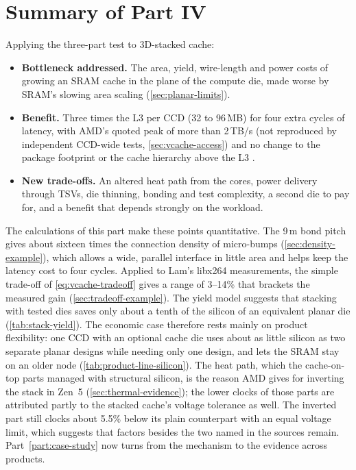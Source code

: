 \section{Summary of Part IV}
Applying the three-part test to 3D-stacked cache:
\begin{itemize}
  \item \textbf{Bottleneck addressed.} The area, yield, wire-length and power costs of growing an SRAM cache in the plane of the compute die, made worse by SRAM's slowing area scaling (\cref{sec:planar-limits}).
  \item \textbf{Benefit.} Three times the L3 per CCD (32 to 96\,MB) for four extra cycles of latency, with AMD's quoted peak of more than 2\,TB/s (not reproduced by independent CCD-wide tests, \cref{sec:vcache-access}) and no change to the package footprint or the cache hierarchy above the L3 \cite{wuu2022vcache,amd2022epyc7003}.
  \item \textbf{New trade-offs.} An altered heat path from the cores, power delivery through TSVs, die thinning, bonding and test complexity, a second die to pay for, and a benefit that depends strongly on the workload.
\end{itemize}

The calculations of this part make these points quantitative. The 9\,\textmu m bond pitch gives about sixteen times the connection density of micro-bumps (\cref{sec:density-example}), which allows a wide, parallel interface in little area and helps keep the latency cost to four cycles. Applied to Lam's libx264 measurements, the simple trade-off of \cref{eq:vcache-tradeoff} gives a range of 3--14\% that brackets the measured gain (\cref{sec:tradeoff-example}). The yield model suggests that stacking with tested dies saves only about a tenth of the silicon of an equivalent planar die (\cref{tab:stack-yield}). The economic case therefore rests mainly on product flexibility: one CCD with an optional cache die uses about as little silicon as two separate planar designs while needing only one design, and lets the SRAM stay on an older node (\cref{tab:product-line-silicon}). The heat path, which the cache-on-top parts managed with structural silicon, is the reason AMD gives for inverting the stack in Zen~5 (\cref{sec:thermal-evidence}); the lower clocks of those parts are attributed partly to the stacked cache's voltage tolerance as well. The inverted part still clocks about 5.5\% below its plain counterpart with an equal voltage limit, which suggests that factors besides the two named in the sources remain. Part~\ref{part:case-study} now turns from the mechanism to the evidence across products.
\clearpage
